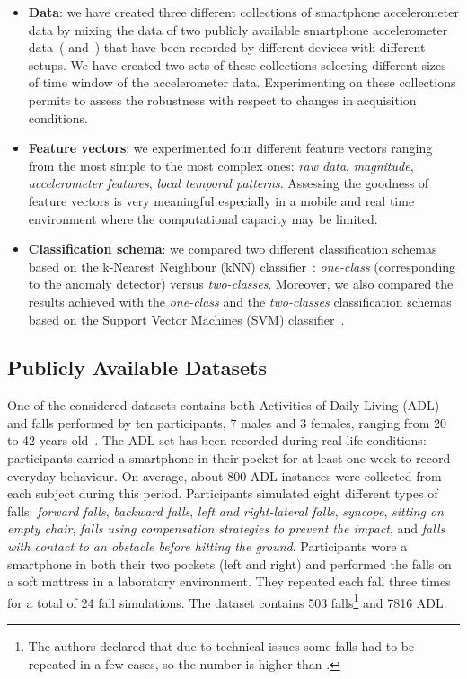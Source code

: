 \documentclass[twocolumn]{svjour3}          \smartqed  \usepackage[draft]{hyperref}
\begin{document}
\begin{itemize}
\item \textbf{Data}: we have created three different collections of smartphone accelerometer data by mixing the data of two publicly available smartphone accelerometer data~(\citet{medrano2014} and~\citet{anguita2013public}) that have been recorded by different devices with different setups. We have created two sets of these collections selecting different sizes of time window of the accelerometer data. Experimenting on these collections permits to assess the robustness with respect to changes in acquisition conditions.
\item \textbf{Feature vectors}: we experimented four different feature vectors ranging from the most simple to the most complex ones: \emph{raw data}, \emph{magnitude}, \emph{accelerometer features}, \emph{local temporal patterns}. Assessing the goodness of feature vectors is very meaningful especially in a mobile and real time environment where the computational capacity may be limited.
\item \textbf{Classification schema}: we compared two different classification schemas based on the k-Nearest Neighbour (kNN) classifier~\citep{KNN1951}: \emph{one-class} (corresponding to the anomaly detector) versus \emph{two-classes}. Moreover, we also compared the results achieved with the \emph{one-class} and the \emph{two-classes} classification schemas based on the Support Vector Machines (SVM) classifier~\citep{SVM1995}.
\end{itemize}


\subsection{Publicly Available Datasets}
One of the considered datasets contains both Activities of Daily Living (ADL) and falls performed by ten participants, 7 males and 3 females, ranging from 20 to 42 years old~\citep{medrano2014}. The ADL set has been recorded during real-life conditions: participants carried a smartphone in their pocket for at least one week to record everyday behaviour. On average, about
800 ADL instances were collected from each subject during this period. Participants simulated eight different types of falls:
\emph{forward falls}, \emph{backward falls}, \emph{left and right-lateral falls}, \emph{syncope}, \emph{sitting on empty chair}, \emph{falls using compensation strategies to prevent the impact}, and \emph{falls with contact to an obstacle before
hitting the ground}. Participants wore a smartphone in both their two pockets (left and right) and performed the falls on a soft mattress in a laboratory
environment. They repeated each fall three times for a total of 24 fall simulations. The dataset contains 503 falls\footnote{The authors declared that due to technical issues some falls had to be repeated in a few cases, so the number is higher than
.} and 7816 ADL.
\end{document}

